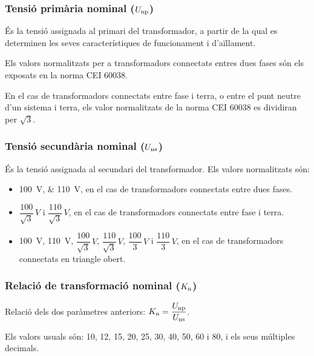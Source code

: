 \subsubsection{Tensió primària nominal ($U_\mathrm{np}$)}

És la tensió assignada al primari del transformador, a partir de la
qual es determinen les seves característiques de funcionament i
d'aïllament.

Els valors normalitzats per a transformadors connectats entres dues fases són els exposats en la norma CEI 60038.

En el cas de transformadors connectats entre fase i terra, o entre el punt neutre d'un sistema i terra, els valor normalitzats de la norma CEI 60038 es dividiran per $\sqrt{3}$.


\subsubsection{Tensió secundària nominal ($U_\mathrm{ns}$)}

És la tensió assignada al secundari del transformador.
Els valors normalitzats són:
\begin{itemize}
    \item \SIlist{100;110}{V}, en el cas de transformadors connectats
    entre dues fases.
    \item $\dfrac{100}{\sqrt{3}}\si{\,V}$ i
        $\dfrac{110}{\sqrt{3}}\si{\,V}$, en el cas de transformadors
        connectats entre fase i terra.
    \item \SI{100}{V}, \SI{110}{V}, $\dfrac{100}{\sqrt{3}}\si{\,V}$,
    $\dfrac{110}{\sqrt{3}}\si{\,V}$, $\dfrac{100}{3}\si{\,V}$   i
    $\dfrac{110}{3}\si{\,V}$, en el cas de transformadors
    connectats en triangle obert.
\end{itemize}

\subsubsection{Relació de transformació nominal ($K_\mathrm{n}$)}

 Relació  dels dos paràmetres anteriors: $K_\mathrm{n} = \dfrac{U_\mathrm{np}}{U_\mathrm{ns}}$.

 Els valors usuals són: 10, 12, 15, 20, 25, 30, 40, 50, 60 i 80, i els seus múltiples decimals.

